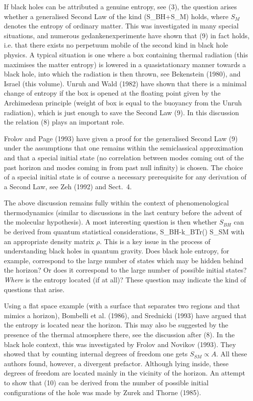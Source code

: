 If black holes can be attributed a genuine entropy, see (3),
the question arises whether a generalised Second Law of the kind
\be {}\left(S_{BH}+S_M\right)  \ee
holds, where $S_M$ denotes the entropy of ordinary matter. 
This was investigated in many special situations, and numerous
gedankenexperimente have shown that (9) in fact holds, i.e. that there exists
no perpetuum mobile of the second kind in black hole physics. 
A typical situation is one where a box containing thermal radiation
(this maximises the matter entropy) is lowered in a quasistationary
manner towards a black hole, into which the radiation is then thrown,
see Bekenstein (1980), and Israel (this volume).
 Unruh and Wald (1982) have shown that
there is a minimal change of entropy if the box is opened at the
floating point given by the Archimedean principle (weight of box
is equal to the buoyancy from the Unruh radiation), which is just enough
to save the Second Law (9). In this discussion the relation
(8) plays an important role.

Frolov and Page (1993) have given a proof for the generalised
Second Law (9) under the assumptions that one remains within
the semiclassical approximation and that a special initial state
(no correlation between modes coming out of the past horizon
and modes coming in from past null infinity) is chosen. 
The choice of a special initial state is of course a necessary
prerequisite for any derivation of a Second Law, see Zeh (1992)
and Sect.~4.

The above discussion remains fully within the context of 
phenomenological thermodynamics (similar to discussions in the
last century before the advent of the molecular hypothesis).
A most interesting question is then whether $S_{BH}$ can be derived from 
quantum statistical considerations,
\be S_{BH}-k_B\mbox{Tr}(\rho\ln\rho)
                       \equiv S_{SM} \ee
with an appropriate density matrix $\rho$. This is a key issue in
the process of understanding black holes in quantum gravity.
Does black hole entropy, for example, correspond to the large
number of states which may be hidden behind the horizon?
Or does it correspond to the large number of possible initial
states? {\em Where} is the entropy located (if at all)?
These question may indicate the kind of questions that arise.

Using a flat space example (with a surface that separates two regions
and that mimics a horizon),
Bombelli et al. (1986), and Srednicki (1993) have argued that
the entropy is located near the horizon. This may also be suggested
by the presence of the thermal atmosphere there, see the discussion
after (8). In the black hole context, this was investigated by
Frolov and Novikov (1993). They showed that by counting internal
degrees of freedom one gets $S_{SM}\propto A$.
All these authors found, however, a divergent
prefactor. Although lying inside, these degrees of freedom
are located mainly in the vicinity of the horizon.
An attempt to show that (10) can be derived from the number of possible
initial configurations of the hole was made by Zurek and Thorne (1985).

